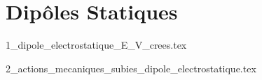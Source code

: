 \chapter{Dipôles Statiques}

\minitoc

{1_dipole_electrostatique_E_V_crees.tex}

{2_actions_mecaniques_subies_dipole_electrostatique.tex}